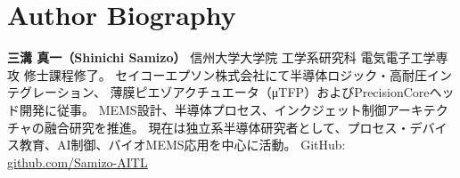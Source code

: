\documentclass[conference]{IEEEtran}
\begin{document}
\section*{Author Biography}
\textbf{三溝 真一（Shinichi Samizo）} 信州大学大学院 工学系研究科 電気電子工学専攻 修士課程修了。
セイコーエプソン株式会社にて半導体ロジック・高耐圧インテグレーション、
薄膜ピエゾアクチュエータ（μTFP）およびPrecisionCoreヘッド開発に従事。
MEMS設計、半導体プロセス、インクジェット制御アーキテクチャの融合研究を推進。
現在は独立系半導体研究者として、プロセス・デバイス教育、AI制御、バイオMEMS応用を中心に活動。
GitHub: \href{https://github.com/Samizo-AITL}{github.com/Samizo-AITL}

\balance
\end{document}
